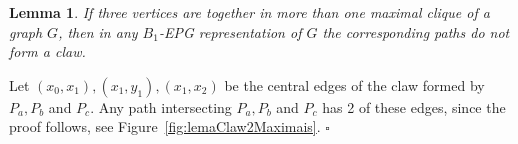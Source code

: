 \documentclass[9pt]{entcs}
\newtheorem{lema}{Lemma}[section]
\begin{document}
\begin{lema}\label{lem:cliquesMaximais}
If three vertices are together  in more than one maximal clique of a graph $G$, then in
any $B_1$-EPG representation of $G$ the corresponding paths do not form a claw.
\end{lema}

\begin{pf}
Let $(x_0,x_1), (x_1,y_1), (x_1,x_2) $ be the central edges of the claw formed by $P_a, P_b$ and $P_c$. Any path intersecting $P_a, P_b$ and $P_c$ has 2 of these edges, since the proof follows, see Figure~\ref{fig:lemaClaw2Maximais}.
 $\square$\end{pf} 



\end{document}
